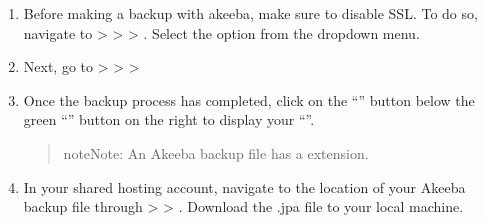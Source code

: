 \documentclass[letterpaper,10pt,english]{sphinxmanual}
\begin{document}
\begin{enumerate}
\item {} 
\sphinxAtStartPar
Before making a backup with akeeba, make sure to \label{\detokenize{joomla-to-vps:disable-ssl}}disable SSL. To do so, navigate to  >  >  > . Select the option  from the drop\sphinxhyphen{}down menu.
\begin{quote}

\begin{figure}[htbp]
\centering

\noindent{}
\end{figure}

\newpage
\end{quote}

\item {} 
\sphinxAtStartPar
Next, go to  >  >  > 
\begin{quote}

\begin{figure}[htbp]
\centering

\noindent{}
\end{figure}
\end{quote}

\item {} 
\sphinxAtStartPar
Once the backup process has completed, click on the “” button below the green “” button on the right to display your “”.
\begin{quote}

\begin{sphinxadmonition}{note}{Note:}
\sphinxAtStartPar
An Akeeba backup file has a  extension.
\end{sphinxadmonition}

\begin{figure}[htbp]
\centering

\noindent{}
\end{figure}
\end{quote}

\item {} 
\sphinxAtStartPar
In your shared hosting account, navigate to the location of your Akeeba backup file through  >  > . Download the .jpa file to your local machine.


\end{enumerate}
\end{document}
